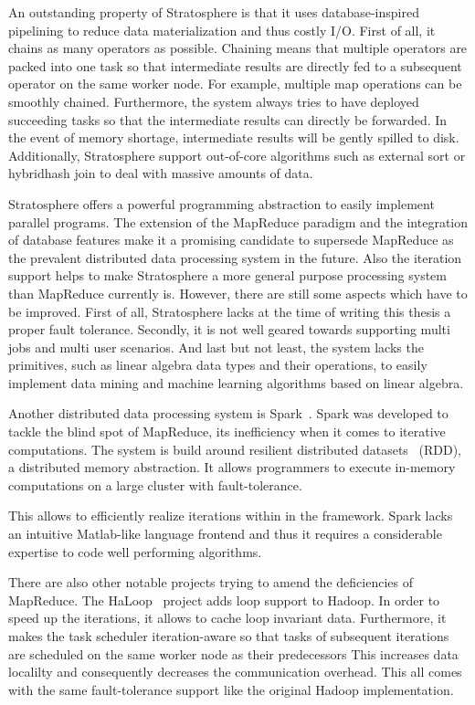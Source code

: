 An outstanding property of Stratosphere is that it uses database-inspired pipelining to reduce data materialization and thus costly I/O.
First of all, it chains as many operators as possible.
Chaining means that multiple operators are packed into one task so that intermediate results are directly fed to a subsequent operator on the same worker node.
For example, multiple map operations can be smoothly chained.
Furthermore, the system always tries to have deployed succeeding tasks so that the intermediate results can directly be forwarded.
In the event of memory shortage, intermediate results will be gently spilled to disk.
Additionally, Stratosphere support out-of-core algorithms such as external sort or hybridhash join to deal with massive amounts of data.

Stratosphere offers a powerful programming abstraction to easily implement parallel programs.
The extension of the MapReduce paradigm and the integration of database features make it a promising candidate to supersede MapReduce as the prevalent distributed data processing system in the future.
Also the iteration support helps to make Stratosphere a more general purpose processing system than MapReduce currently is.
However, there are still some aspects which have to be improved.
First of all, Stratosphere lacks at the time of writing this thesis a proper fault tolerance.
Secondly, it is not well geared towards supporting multi jobs and multi user scenarios.
And last but not least, the system lacks the primitives, such as linear algebra data types and their operations, to easily implement data mining and machine learning algorithms based on linear algebra.

Another distributed data processing system is Spark~\cite{zaharia:2010a}.
Spark was developed to tackle the blind spot of MapReduce, its inefficiency when it comes to iterative computations.
The system is build around resilient distributed datasets~\cite{zaharia:2012a} (RDD), a distributed memory abstraction.
It allows programmers to execute in-memory computations on a large cluster with fault-tolerance.


This allows to efficiently realize iterations within in the framework.
Spark lacks an intuitive Matlab-like language frontend and thus it requires a considerable expertise to code well performing algorithms.

There are also other notable projects trying to amend the deficiencies of MapReduce.
The HaLoop~\cite{bu:pve2010a} project adds loop support to Hadoop.
In order to speed up the iterations, it allows to cache loop invariant data.
Furthermore, it makes the task scheduler iteration-aware so that tasks of subsequent iterations are scheduled on the same worker node as their predecessors
This increases data localilty and consequently decreases the communication overhead.
This all comes with the same fault-tolerance support like the original Hadoop implementation.

